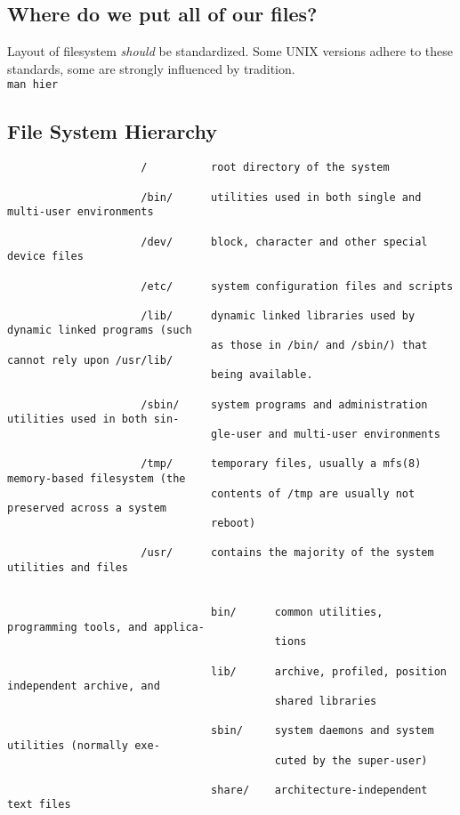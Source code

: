 \documentclass[xga]{xdvislides}
\begin{document}
\subsection{Where do we put all of our files?}
Layout of filesystem {\em should} be standardized.  Some UNIX versions adhere
to these standards, some are strongly influenced by tradition.
\\

{\tt man hier}

\subsection{File System Hierarchy}
\small
\begin{verbatim}
                     /          root directory of the system

                     /bin/      utilities used in both single and multi-user environments

                     /dev/      block, character and other special device files

                     /etc/      system configuration files and scripts

                     /lib/      dynamic linked libraries used by dynamic linked programs (such
                                as those in /bin/ and /sbin/) that cannot rely upon /usr/lib/
                                being available.

                     /sbin/     system programs and administration utilities used in both sin-
                                gle-user and multi-user environments

                     /tmp/      temporary files, usually a mfs(8) memory-based filesystem (the
                                contents of /tmp are usually not preserved across a system
                                reboot)

                     /usr/      contains the majority of the system utilities and files


                                bin/      common utilities, programming tools, and applica-
                                          tions

                                lib/      archive, profiled, position independent archive, and
                                          shared libraries

                                sbin/     system daemons and system utilities (normally exe-
                                          cuted by the super-user)

                                share/    architecture-independent text files
\end{verbatim}
\Normalsize
\end{document}
